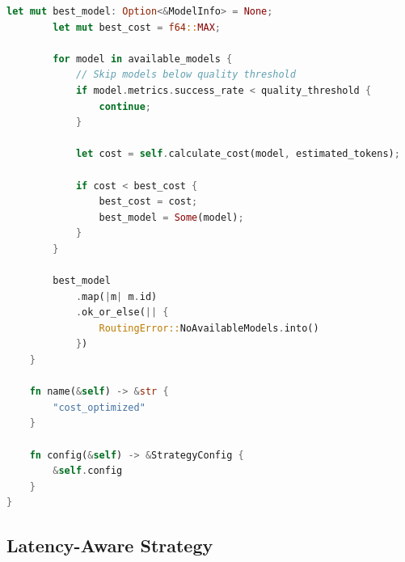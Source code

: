 \documentclass[12pt,a4paper,twoside]{report}
\begin{document}
\begin{lstlisting}[language=Rust,caption={Cost-Optimized Routing - crates/gaussmeridian-router/src/strategies/cost.rs}]
        let mut best_model: Option<&ModelInfo> = None;
        let mut best_cost = f64::MAX;
        
        for model in available_models {
            // Skip models below quality threshold
            if model.metrics.success_rate < quality_threshold {
                continue;
            }
            
            let cost = self.calculate_cost(model, estimated_tokens);
            
            if cost < best_cost {
                best_cost = cost;
                best_model = Some(model);
            }
        }
        
        best_model
            .map(|m| m.id)
            .ok_or_else(|| {
                RoutingError::NoAvailableModels.into()
            })
    }
    
    fn name(&self) -> &str {
        "cost_optimized"
    }
    
    fn config(&self) -> &StrategyConfig {
        &self.config
    }
}
\end{lstlisting}

\subsection{Latency-Aware Strategy}
\end{document}
